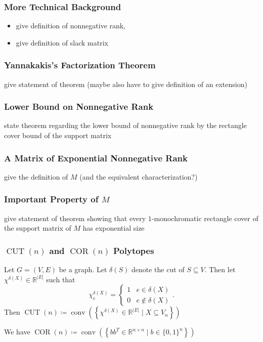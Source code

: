 \documentclass{beamer}
\newcommand{\abs}[1]{\left|#1\right|}
\newcommand{\conv}{\operatorname{conv}}
\newcommand{\CUT}{\operatorname{CUT}}
\newcommand{\COR}{\operatorname{COR}}
\renewcommand{\R}{\mathbb{R}}
\begin{document}
\begin{frame}
\frametitle{More Technical Background}
\begin{itemize}
\item give definition of nonnegative rank,
\item give definition of slack matrix
\end{itemize}
\end{frame}


\begin{frame}
\frametitle{Yannakakis's Factorization Theorem}
give statement of theorem (maybe also have to give definition of an extension)
\end{frame}


\begin{frame}
\frametitle{Lower Bound on Nonnegative Rank}
state theorem regarding the lower bound of nonnegative rank by the rectangle cover bound of the support matrix
\end{frame}


\begin{frame}
\frametitle{A Matrix of Exponential Nonnegative Rank}
give the definition of $M$ (and the equivalent characterization?)
\end{frame}


\begin{frame}
\frametitle{Important Property of $M$}
give statement of theorem showing that every $1$-monochromatic rectangle cover of the support matrix of $M$ has exponential size
\end{frame}


\begin{frame}
\frametitle{$\CUT(n)$ and $\COR(n)$ Polytopes}
\begin{definition}
Let $G = (V,E)$ be a graph. Let $\delta(S)$ denote the cut of $S \subseteq V$. Then let $\chi^{\delta(X)} \in \R^{\abs{E}}$ such that
\[
\chi^{\delta(X)}_e =
\begin{cases}
1 & e \in \delta(X) \\
0 & e \notin \delta(X)
\end{cases}.
\]
Then $\CUT(n) \coloneqq \conv\left( \left\{ \chi^{\delta(X)} \in \R^{\abs{E}} \mid X \subseteq V_n \right\} \right)$
\end{definition}
\begin{definition}
We have $\COR(n) \coloneqq \conv\left( \left\{ bb^T \in \R^{n \times n} \mid b \in {\{0, 1\}}^n \right\} \right)$
\end{definition}
\end{frame}
\end{document}
